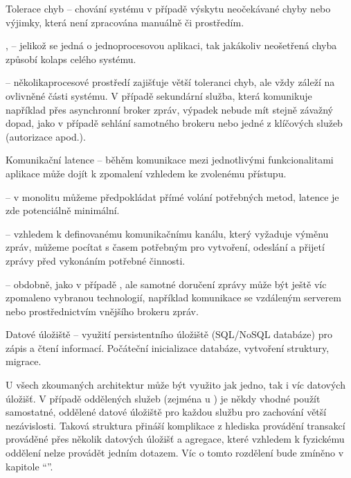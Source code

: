 \begin{dl}
   \item[Tolerace chyb] – chování systému v případě výskytu neočekávané chyby nebo výjimky, která není zpracována manuálně či  prostředím.
\end{dl}
\begin{ul}
   \item {},  – jelikož se jedná o jednoprocesovou aplikaci, tak jakákoliv neošetřená chyba způsobí kolaps celého systému.
   \item {} – několikaprocesové prostředí zajišťuje větší toleranci chyb, ale vždy záleží na ovlivněné části systému.
   V případě sekundární služba, která komunikuje například přes asynchronní broker zpráv, výpadek nebude mít stejně závažný dopad, jako v případě sehlání samotného brokeru nebo jedné z klíčových služeb (autorizace apod.).
\end{ul}

\begin{dl}
   \item[Komunikační latence] – běhěm komunikace mezi jednotlivými funkcionalitami aplikace může dojít k zpomalení vzhledem ke zvolenému přístupu.
\end{dl}
\begin{ul}
   \item {} – v monolitu můžeme předpokládat přímé volání potřebných metod, latence je zde potenciálně minimální.
   \item {} – vzhledem k definovanému komunikačnímu kanálu, který vyžaduje výměnu zpráv, můžeme pocítat s časem potřebným pro vytvoření, odeslání a přijetí zprávy před vykonáním potřebné činnosti.
   \item {} – obdobně, jako v případě , ale samotné doručení zprávy může být ještě víc zpomaleno vybranou technologií, například komunikace se vzdáleným serverem nebo prostřednictvím vnějšího brokeru zpráv.
\end{ul}

\begin{dl}
   \item[Datové úložiště] – využití persistentního úložiště (SQL/NoSQL databáze) pro zápis a čtení informací.
   Počáteční inicializace databáze, vytvoření struktury, migrace.

   U všech zkoumaných architektur může být využito jak jedno, tak i víc datových úložišť.
   V případě oddělených služeb (zejména u ) je někdy vhodné použít samostatné, oddělené datové úložiště pro každou službu pro zachování větší nezávislosti.
   Taková struktura přináší komplikace z hlediska provádění transakcí prováděné přes několik datových úložišť a agregace, které vzhledem k fyzickému oddělení nelze provádět jedním  dotazem.
   Víc o tomto rozdělení bude zmíněno v kapitole \enquote{}.
\end{dl}

